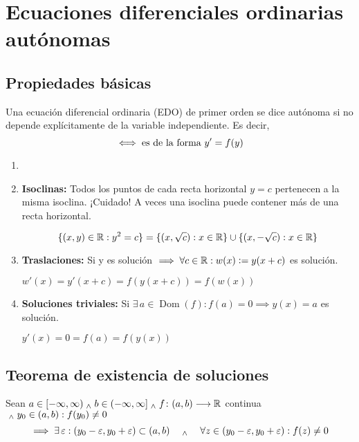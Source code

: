 \section{Ecuaciones diferenciales ordinarias autónomas}

\subsection{Propiedades básicas}

\begin{defn}
	Una ecuación diferencial ordinaria (EDO) de primer orden se dice autónoma si no depende explícitamente de la variable independiente. Es decir,
	\[\iff \text{es de la forma } y'=f(y)\]
\end{defn}

\begin{prop}
	\begin{enumerate}
		\item[]
		\item \textbf{Isoclinas:} Todos los puntos de cada recta horizontal $y=c$ pertenecen a la misma isoclina. ¡Cuidado! A veces una isoclina puede contener más de una recta horizontal.
		      \begin{ejem}[$y'=y^2$]
			      \[\{(x,y)\in \mathbb{R}:y^2=c\}=\{(x,\sqrt{c}):x\in\mathbb{R}\}\cup\{(x,-\sqrt{c}):x\in\mathbb{R}\}\]
		      \end{ejem}
		\item \textbf{Traslaciones:} Si y es solución $\implies \forall c \in \mathbb{R} : w(x)\vcentcolon= y(x+c)$ es solución.
		      \begin{dem}
			      $w'(x)=y'(x+c)=f(y(x+c))=f(w(x))$
		      \end{dem}
		\item \textbf{Soluciones triviales:} Si $\exists \, a \in \operatorname{Dom}(f) : f(a)=0 \implies y(x)=a$ es solución.
		      \begin{dem}
			      $y'(x)=0=f(a)=f(y(x))$
		      \end{dem}
	\end{enumerate}
\end{prop}
\subsection{Teorema de existencia de soluciones}
Sean $a\in [-\infty, \infty) \; _{\wedge} \; b\in (-\infty, \infty] \; _{\wedge} \; f \colon (a,b) \longrightarrow \mathbb{R}$ continua $ \; _{\wedge} \; y_0 \in (a,b) : f(y_0) \ne 0$
\[\implies \exists \, \varepsilon : (y_0-\varepsilon, y_0+\varepsilon) \subset (a,b) \quad \; _{\wedge} \; \quad \forall z \in (y_0-\varepsilon, y_0+\varepsilon) : f(z)\ne 0\]


